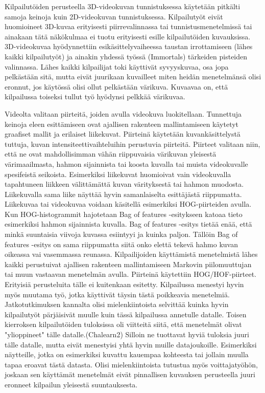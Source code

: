 Kilpailutöiden perusteella 3D-videokuvan tunnistuksessa käytetään pitkälti samoja keinoja kuin 2D-videokuvan tunnistuksessa.
Kilpailutyöt eivät huomioineet 3D-kuvaa erityisesti piirrevalinnassa tai tunnistusmenetelmissä tai ainakaan tätä näkökulmaa ei tuotu erityisesti
esille kilpailutöiden kuvauksissa. 3D-videokuvaa hyödynnettiin esikäsittelyvaiheessa taustan irrottamiseen 
(lähes kaikki kilpailutyöt) ja ainakin yhdessä työssä (Immortals) tärkeiden pisteiden valinnassa. 
Lähes kaikki kilpailijat toki käyttivät syvyyskuvaa, osa jopa pelkästään sitä, mutta eivät juurikaan
kuvailleet miten heidän menetelmänsä olisi eronnut, jos käytössä olisi ollut pelkästään värikuva.
Kuvaavaa on, että kilpailussa toiseksi tullut työ hyödynsi pelkkää värikuvaa.

Videolta valitaan piirteitä, joiden avulla videokuva luokitellaan. Tunnettuja keinoja eleen esittämiseen ovat ajallisen rakenteen mallintamiseen
käytetyt graafiset mallit ja erilaiset liikekuvat. Piirteinä käytetään kuvankäsittelystä tuttuja, kuvan intensiteettivaihteluihin perustuvia piirteitä.
Piirteet valitaan niin, että ne ovat mahdollisimman vähän riippuvaisia värikuvan yleisestä värimaailmasta, hahmon sijainnista tai koosta kuvalla tai
muista videokuvalle spesifeistä seikoista. Esimerkiksi liikekuvat huomioivat vain videokuvalla tapahtuneen liikkeen välittämättä kuvan värityksestä
tai hahmon muodosta. Liikekuvalla sama liike näyttää hyvin samanlaiselta esittäjästä riippumatta. Liikekuvaa tai videokuvaa voidaan käsitellä esimerkiksi
HOG-piirteiden avulla. Kun HOG-histogrammit hajotetaan Bag of features -esitykseen katoaa tieto esimerkiksi hahmon sijainnista kuvalla.
Bag of features -esitys tietää enää, että minkä suuntaisia viivoja kuvassa esiintyyi ja kuinka paljon. Tällöin Bag of features -esitys on sama
riippumatta siitä onko elettä tekevä hahmo kuvan oikeassa vai vasemmassa reunassa. Kilpailijoiden käyttämistä menetelmistä lähes kaikki perustuivat ajallisen rakenteen mallintamiseen 
Markovin piilomuuttujan tai muun vastaavan menetelmän avulla. Piirteinä käytettiin HOG/HOF-piirteet. 
Erityisiä perusteluita tälle ei kuitenkaan esitetty. Kilpailussa menestyi hyvin myös muutama työ, jotka käyttivät täysin tästä poikkeavia menetelmiä.\\

Jatkotutkimuksen kannalta olisi mielenkiintoista selvittää kuinka hyvin kilpailutyöt pärjäisivät
muulle kuin tässä kilpailussa annetulle datalle. Toisen kierroksen kilpailutöiden tuloksissa oli viitteitä
siitä, että menetelmät olivat "ylioppineet" tälle datalle.(Chalearn2) Silloin ne tuottavat hyviä tuloksia juuri
tälle datalle, mutta eivät menestyisi yhtä hyvin muille datajoukoille. Esimerkiksi näytteille, jotka on esimerkiksi kuvattu kauempaa 
kohteesta tai jollain muulla tapaa eroavat tästä datasta. Olisi mielenkiintoista tutustua myös voittajatyöhön, joskaan sen käyttämät menetelmät eivät pinnallisen
kuvauksen perusteella juuri eronneet kilpailun yleisestä suuntauksesta.\\

